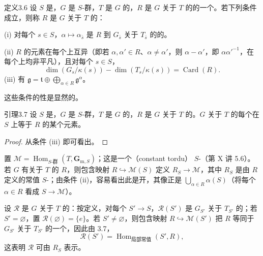 \begin{SGAresult}{定义}{3.6}
设 $S$ 是，$G$ 是 $S$-群，$T$ 是 $G$ 的，$R$ 是 $G$ 关于 $T$ 的的一个。若下列条件成立，则称 $R$ 是 $G$ 关于 $T$ 的：

(i) 对每个 $s\in S$，$\alpha\mapsto\alpha_{\bar s}$ 是 $R$ 到 $G_{\bar s}$ 关于 $T_{\bar s}$ 的的。

(ii) $R$ 的元素在每个上互异（即若 $\alpha,\alpha'\in R$、$\alpha\ne\alpha'$，则 $\alpha-\alpha'$，即 $\alpha\alpha'^{-1}$，在每个上均非平凡），且对每个 $s\in S$，
\[
\dim(G_s/\kappa(s))-\dim(T_s/\kappa(s))=\operatorname{Card}(R).
\]
(iii) 有 $\mathfrak g=\mathfrak t\oplus\bigoplus_{\alpha\in R}\mathfrak g^\alpha$。

这些条件的性是显然的。
\end{SGAresult}
\begin{SGAresult}{引理}{3.7}
设 $S$ 是，$G$ 是 $S$-群，$T$ 是 $G$ 的，$R$ 是 $G$ 关于 $T$ 的。$G$ 关于 $T$ 的每个在 $S$ 上等于 $R$ 的某个元素。
\end{SGAresult}
\begin{proof}从条件 (iii) 即可看出。\end{proof}
置 $\mathscr M=\operatorname{Hom}_{S\text{-群}}(T,\mathbf G_{\mathrm m,S})$；这是一个（constant tordu） $S$-（第 X 讲 5.6）。若 $G$ 有关于 $T$ 的 $R$，则包含映射 $R\hookrightarrow\mathscr M(S)$ 定义 $R_S\to\mathscr M$，其中 $R_S$ 是由 $R$ 定义的常值 $S$-；由条件 (ii)，容易看出此是开，其像正是 $\bigcup_{\alpha\in R}\alpha(S)$（将每个 $\alpha\in R$ 看成 $S\to\mathscr M$）。

设 $\mathscr R$ 是 $G$ 关于 $T$ 的：按定义，对每个 $S'\to S$，$\mathscr R(S')$ 是 $G_{S'}$ 关于 $T_{S'}$ 的；若 $S'=\varnothing$，置 $\mathscr R(\varnothing)=\{e\}$。若 $S'\ne\varnothing$，则包含映射 $R\hookrightarrow\mathscr M(S')$ 把 $R$ 等同于 $G_{S'}$ 关于 $T_{S'}$ 的一个，因此由 3.7，
\[
\mathscr R(S')=\operatorname{Hom}_{\text{局部常值}}(S',R),
\]
这表明 $\mathscr R$ 可由 $R_S$ 表示。

